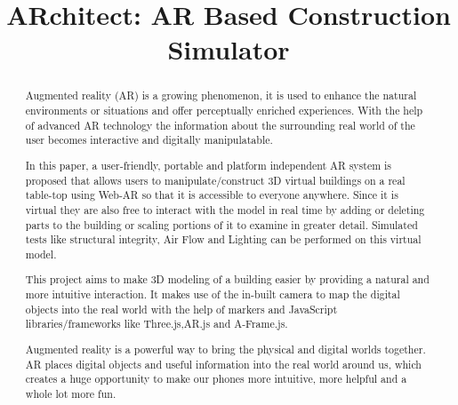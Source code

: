 \documentclass[conference]{IEEEtran}
\begin{document}
\title{ARchitect: AR Based Construction Simulator}

\author{
\and
{}
\and
{}
\and
{}
}

\maketitle


\begin{abstract}
 Augmented reality (AR) is a growing phenomenon, it is used to enhance the natural environments 
 or situations and offer perceptually enriched experiences.
 With the help of advanced AR technology the information about the surrounding 
 real world of the user becomes interactive and digitally manipulatable.

In this paper, a user-friendly, portable and platform independent AR system 
is proposed that allows users to manipulate/construct 3D virtual buildings on a real table-top using Web-AR so that it is accessible to everyone anywhere. Since it is virtual they are also free to interact with the model in real time by adding or  deleting parts to the building or scaling portions of it to examine in greater detail. Simulated tests like structural integrity, Air Flow and Lighting can be performed on this virtual model. 

This project aims to make 3D modeling of a building easier by providing a
 natural and more intuitive interaction. It makes use of the in-built camera
 to map the digital objects into the real world with the help of markers and
 JavaScript libraries/frameworks like Three.js,AR.js and A-Frame.js.
 
 Augmented reality is a powerful way to bring the physical and digital worlds
 together. AR places digital objects and useful information into the real world  around us, which creates a huge opportunity to make our phones more intuitive, more helpful and a whole lot more fun.
\end{abstract}
\end{document}
